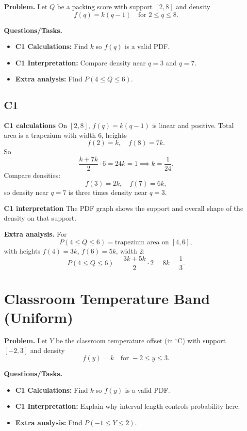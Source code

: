 \textbf{Problem.}
Let $Q$ be a packing score with support $[2,8]$ and density
\[
f(q)=k(q-1)\quad\text{for }2\le q\le 8.
\]

\textbf{Questions/Tasks.}
\begin{itemize}
	\item \textbf{C1 Calculations:} Find $k$ so $f(q)$ is a valid PDF.
	\item \textbf{C1 Interpretation:} Compare density near $q=3$ and $q=7$.
	\item \textbf{Extra analysis:} Find $P(4\le Q\le 6)$.
\end{itemize}

\subsection*{C1}

\textbf{C1 calculations}
On $[2,8]$, $f(q)=k(q-1)$ is linear and positive. Total area is a trapezium with width $6$, heights
	\[
	f(2)=k,\quad f(8)=7k.
	\]
	So
	\[
	\frac{k+7k}{2}\cdot6=24k=1\implies k=\frac1{24}.
	\]
	Compare densities:
	\[
	f(3)=2k,\quad f(7)=6k,
	\]
	so density near $q=7$ is three times density near $q=3$.

\textbf{C1 interpretation}
The PDF graph shows the support and overall shape of the density on that support.

\textbf{Extra analysis.}
For
\[
P(4\le Q\le6)=\text{trapezium area on }[4,6],
\]
with heights $f(4)=3k$, $f(6)=5k$, width $2$:
\[
P(4\le Q\le6)=\frac{3k+5k}{2}\cdot2=8k=\frac13.
\]

	\section{Classroom Temperature Band (Uniform)}
	
	\textbf{Problem.}
	Let $Y$ be the classroom temperature offset (in $^\circ$C) with support $[-2,3]$ and density
	\[
	f(y)=k\quad\text{for }-2\le y\le 3.
	\]
	
	\textbf{Questions/Tasks.}
	\begin{itemize}
		\item \textbf{C1 Calculations:} Find $k$ so $f(y)$ is a valid PDF.
		\item \textbf{C1 Interpretation:} Explain why interval length controls probability here.
		\item \textbf{Extra analysis:} Find $P(-1\le Y\le 2)$.
	\end{itemize}

